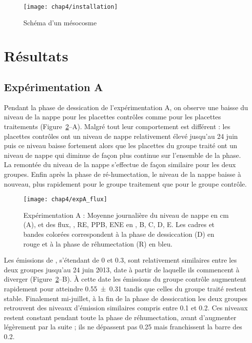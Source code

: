 \begin{figure}
\centering
\texttt{[image: chap4/installation]}
\caption{Schéma d'un mésocosme}
\label{fig:mesocarte}
\end{figure}

\section{Résultats}

\subsection{Expérimentation A}

Pendant la phase de dessication de l'expérimentation A, on observe une baisse du niveau de la nappe pour les placettes contrôles comme pour les placettes traitements (Figure~\ref{fig:HMzi}--A).
Malgré tout leur comportement est différent : les placettes contrôles ont un niveau de nappe relativement élevé jusqu'au 24 juin puis ce niveau baisse fortement alors que les placettes du groupe traité ont un niveau de nappe qui diminue de façon plus continue sur l'ensemble de la phase.
La remontée du niveau de la nappe s'effectue de façon similaire pour les deux groupes.
Enfin après la phase de ré-humectation, le niveau de la nappe baisse à nouveau, plus rapidement pour le groupe traitement que pour le groupe contrôle.


\begin{figure}
\centering
\texttt{[image: chap4/expA\_flux]}
\caption{Expérimentation A : Moyenne journalière du niveau de nappe en cm (A), et des flux, \chh, RE, PPB, ENE en \si{\uml}, B, C, D, E. Les cadres et bandes colorées correspondent à la phase de dessiccation (D) en rouge et à la phase de réhumectation (R) en bleu.}
\label{fig:HMzi}
\end{figure}


Les émissions de \chh, s'étendant de 0 et \SI{0.3}{\uml}, sont relativement similaires entre les deux groupes jusqu'au 24 juin 2013, date à partir de laquelle ils commencent à diverger (Figure~\ref{fig:HMzi}--B).
À cette date les émissions du groupe contrôle augmentent rapidement pour atteindre \SI{0.55(031)}{\uml} tandis que celles du groupe traité restent stable.
Finalement mi-juillet, à la fin de la phase de dessiccation les deux groupes retrouvent des niveaux d'émission similaires compris entre \num{0.1} et \SI{0.2}{\uml}.
Ces niveaux restent constant pendant toute la phase de réhumectation, avant d'augmenter légèrement par la suite ; ils ne dépassent pas \SI{0.25}{\uml} mais franchissent la barre des \SI{0.2}{\uml}.

